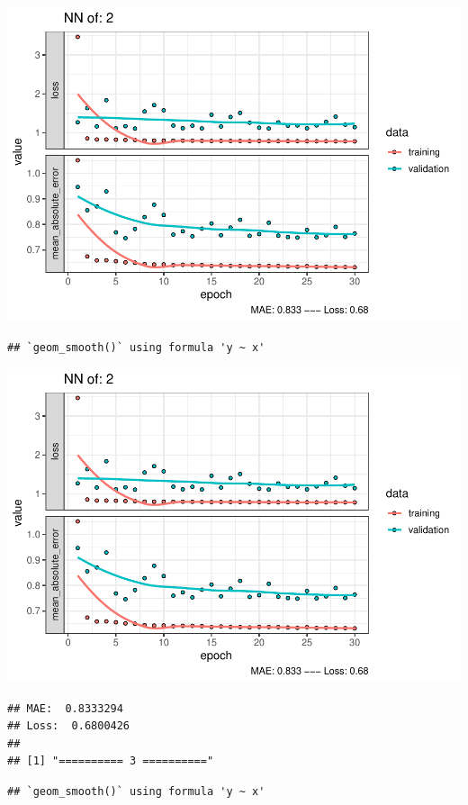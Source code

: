\documentclass[
]{article}
\begin{document}
\includegraphics{project-code_files/figure-latex/unnamed-chunk-18-3.pdf}

\begin{verbatim}
## `geom_smooth()` using formula 'y ~ x'
\end{verbatim}

\includegraphics{project-code_files/figure-latex/unnamed-chunk-18-4.pdf}

\begin{verbatim}
## MAE:  0.8333294
## Loss:  0.6800426 
## 
## [1] "========== 3 =========="
\end{verbatim}

\begin{verbatim}
## `geom_smooth()` using formula 'y ~ x'
\end{verbatim}
\end{document}
